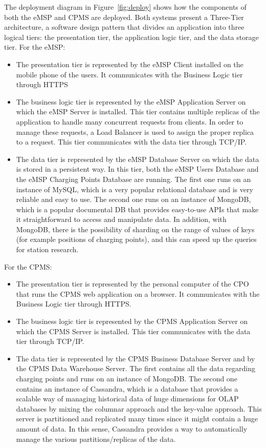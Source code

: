 \documentclass{Configuration_Files/PoliMi3i_thesis}
\begin{document}
The deployment diagram in Figure~\ref{fig:deploy} shows how the components of both the eMSP and CPMS are deployed. Both systems present a Three-Tier architecture, a software design pattern that divides an application into three logical tiers: the presentation tier, the application logic tier, and the data storage tier. For the eMSP:
\begin{itemize}
    \item The presentation tier is represented by the eMSP Client installed on the mobile phone of the users. It communicates with the Business Logic tier through HTTPS
    \item The business logic tier is represented by the eMSP Application Server on which the eMSP Server is installed. This tier contains multiple replicas of the application to handle many concurrent requests from clients. In order to manage these requests, a Load Balancer is used to assign the proper replica to a request. This tier communicates with the data tier through TCP/IP.
    \item The data tier is represented by the eMSP Database Server on which the data is stored in a persistent way. In this tier, both the eMSP Users Database and the eMSP Charging Points Database are running. The first one runs on an instance of MySQL, which is a very popular relational database and is very reliable and easy to use. The second one runs on an instance of MongoDB, which is a popular documental DB that provides easy-to-use APIs that make it straightforward to access and manipulate data. In addition, with MongoDB, there is the possibility of sharding on the range of values of keys (for example positions of charging points), and this can speed up the queries for station research.
\end{itemize} 
For the CPMS:
\begin{itemize}
    \item The presentation tier is represented by the personal computer of the CPO that runs the CPMS web application on a browser. It communicates with the Business Logic tier through HTTPS.
    \item The business logic tier is represented by the CPMS Application Server on which the CPMS Server is installed. This tier communicates with the data tier through TCP/IP.
    \item The data tier is represented by the CPMS Business Database Server and by the CPMS Data Warehouse Server. The first contains all the data regarding charging points and runs on an instance of MongoDB. The second one contains an instance of Cassandra, which is a database that provides a scalable way of managing historical data of huge dimensions for OLAP databases by mixing the columnar approach and the key-value approach. This server is partitioned and replicated many times since it might contain a huge amount of data. In this sense, Cassandra provides a way to automatically manage the various partitions/replicas of the data.
\end{itemize}
\end{document}
